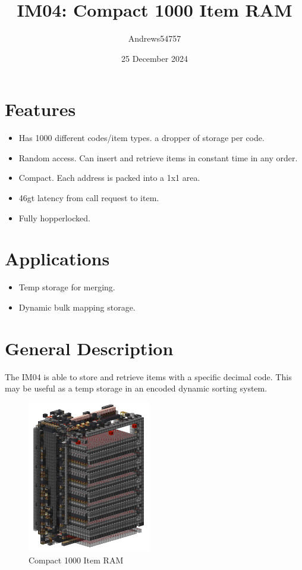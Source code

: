 \documentclass[10pt]{datasheet}
\title{IM04: Compact 1000 Item RAM}
\author{Andrews54757}
\date{25 December 2024}
\begin{document}
\maketitle

\section{Features}

\begin{itemize}
\item{Has 1000 different codes/item types. a dropper of storage per code.}
\item{Random access. Can insert and retrieve items in constant time in any order.}
\item{Compact. Each address is packed into a 1x1 area.}
\item{46gt latency from call request to item.}
\item{Fully hopperlocked.}
\end{itemize}

\section{Applications}
\begin{itemize}
\item{Temp storage for merging.}
\item{Dynamic bulk mapping storage.}
\end{itemize}

\section{General Description}
The IM04 is able to store and retrieve items with a specific decimal code. This may be useful as a temp storage in an encoded dynamic sorting system.

\vfill\break

\begin{figure}[H]
    \centering
    \includegraphics[width=0.48\textwidth]{imageassa.png}
    \caption{\centering Compact 1000 Item RAM}
\end{figure}
\end{document}
